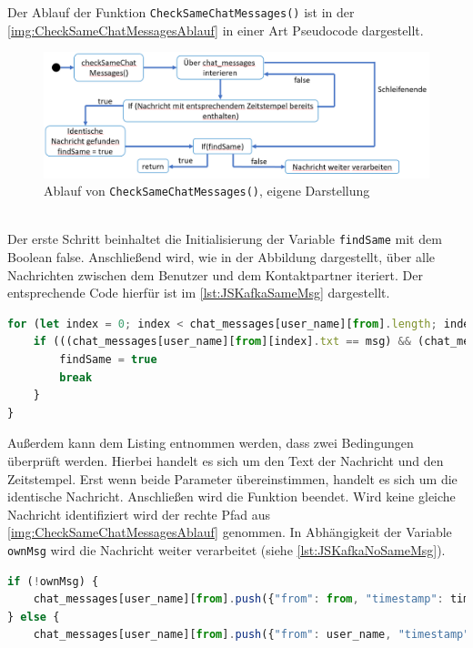 \documentclass[a4paper,titlepage,halfparskip,12pt]{scrreprt}
\begin{document}
\begin{onehalfspacing}
\pagebreak

Der Ablauf der Funktion \texttt{CheckSameChatMessages()} ist in der \autoref{img:CheckSameChatMessagesAblauf} in einer Art Pseudocode dargestellt.
\begin{figure}[h]
	\centering
	\includegraphics[scale=0.5]{images/CheckSameChatMessagesAblauf}
	\caption{Ablauf von \texttt{CheckSameChatMessages()}, eigene Darstellung}
	\label{img:CheckSameChatMessagesAblauf}
\end{figure}\\
Der erste Schritt beinhaltet die Initialisierung der Variable \texttt{findSame} mit dem Boolean false. Anschließend wird, wie in der Abbildung dargestellt, über alle Nachrichten zwischen dem Benutzer und dem Kontaktpartner iteriert. Der entsprechende Code hierfür ist im \autoref{lst:JSKafkaSameMsg} dargestellt.
\begin{lstlisting}[language=Javascript,caption=Suchen der identischen Nachricht,label={lst:JSKafkaSameMsg}]
for (let index = 0; index < chat_messages[user_name][from].length; index++) {
	if (((chat_messages[user_name][from][index].txt == msg) && (chat_messages[user_name][from][index].timestamp == timestamp))) {
		findSame = true
		break
	}
}
\end{lstlisting}
Außerdem kann dem Listing entnommen werden, dass zwei Bedingungen überprüft werden. Hierbei handelt es sich um den Text der Nachricht und den Zeitstempel. Erst wenn beide Parameter übereinstimmen, handelt es sich um die identische Nachricht. Anschließen wird die Funktion beendet. Wird keine gleiche Nachricht identifiziert wird der rechte Pfad aus \autoref{img:CheckSameChatMessagesAblauf} genommen. In Abhängigkeit der Variable \texttt{ownMsg} wird die Nachricht weiter verarbeitet (siehe \autoref{lst:JSKafkaNoSameMsg}).
\begin{lstlisting}[language=Javascript,caption=Weitere Verarbeitung der Nachricht,label={lst:JSKafkaNoSameMsg}]
if (!ownMsg) {
	chat_messages[user_name][from].push({"from": from, "timestamp": timestamp, "txt": msg, "type": "chat"});
} else {
	chat_messages[user_name][from].push({"from": user_name, "timestamp": timestamp, "txt": msg, "type": "chat"}); 

\end{lstlisting}
\end{onehalfspacing}
\end{document}
